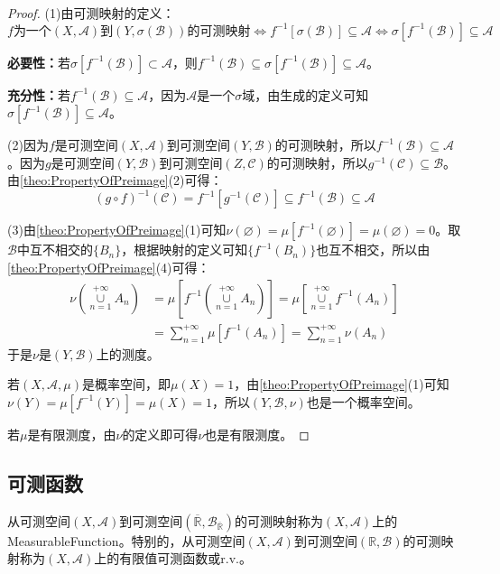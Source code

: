 \begin{proof}
	(1)由可测映射的定义：
	\begin{equation*}
		\text{$f$为一个$(X,\mathscr{A})$到$(Y,\sigma(\mathscr{B}))$的可测映射}
		\Leftrightarrow f^{-1}[\sigma(\mathscr{B})]\subseteq\mathscr{A}
		\Leftrightarrow
		\sigma[f^{-1}(\mathscr{B})]\subseteq\mathscr{A}
	\end{equation*}\par
	\textbf{必要性：}若$\sigma[f^{-1}(\mathscr{B})]\subset\mathscr{A}$，则$f^{-1}(\mathscr{B})\subseteq\sigma[f^{-1}(\mathscr{B})]\subseteq\mathscr{A}$。\par
	\textbf{充分性：}若$f^{-1}(\mathscr{B})\subseteq\mathscr{A}$，因为$\mathscr{A}$是一个$\sigma$域，由生成的定义可知$\sigma[f^{-1}(\mathscr{B})]\subseteq\mathscr{A}$。\par
	(2)因为$f$是可测空间$(X,\mathscr{A})$到可测空间$(Y,\mathscr{B})$的可测映射，所以$f^{-1}(\mathscr{B})\subseteq\mathscr{A}$。因为$g$是可测空间$(Y,\mathscr{B})$到可测空间$(Z,\mathscr{C})$的可测映射，所以$g^{-1}(\mathscr{C})\subseteq\mathscr{B}$。由\cref{theo:PropertyOfPreimage}(2)可得：
	\begin{equation*}
		(g\circ f)^{-1}(\mathscr{C})=f^{-1}[g^{-1}(\mathscr{C})]\subseteq f^{-1}(\mathscr{B})\subseteq\mathscr{A}
	\end{equation*}\par
	(3)由\cref{theo:PropertyOfPreimage}(1)可知$\nu(\varnothing)=\mu[f^{-1}(\varnothing)]=\mu(\varnothing)=0$。取$\mathscr{B}$中互不相交的$\{B_n\}$，根据映射的定义可知$\{f^{-1}(B_n)\}$也互不相交，所以由\cref{theo:PropertyOfPreimage}(4)可得：
	\begin{align*}
		\nu\left(\underset{n=1}{\overset{+\infty}{\cup}}A_n\right)&=\mu\left[f^{-1}\left(\underset{n=1}{\overset{+\infty}{\cup}}A_n\right)\right]=\mu\left[\underset{n=1}{\overset{+\infty}{\cup}}f^{-1}(A_n)\right] \\
		&=\sum_{n=1}^{+\infty}\mu[f^{-1}(A_n)]=\sum_{n=1}^{+\infty}\nu(A_n)
	\end{align*}
	于是$\nu$是$(Y,\mathscr{B})$上的测度。\par
	若$(X,\mathscr{A},\mu)$是概率空间，即$\mu(X)=1$，由\cref{theo:PropertyOfPreimage}(1)可知$\nu(Y)=\mu[f^{-1}(Y)]=\mu(X)=1$，所以$(Y,\mathscr{B},\nu)$也是一个概率空间。\par
	若$\mu$是有限测度，由$\nu$的定义即可得$\nu$也是有限测度。\par
\end{proof}

\subsection{可测函数}
\begin{definition}
	从可测空间$(X,\mathscr{A})$到可测空间$(\overline{\mathbb{R}},\mathcal{B}_{\overline{\mathbb{R}}})$的可测映射称为$(X,\mathscr{A})$上的\gls{MeasurableFunction}。特别的，从可测空间$(X,\mathscr{A})$到可测空间$(\mathbb{R},\mathcal{B})$的可测映射称为$(X,\mathscr{A})$上的有限值可测函数或\gls{r.v.}。
\end{definition}
